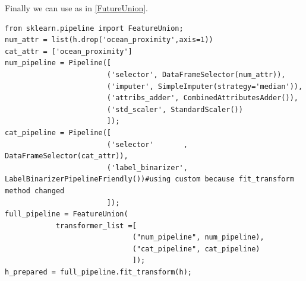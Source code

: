 Finally we can use  as in \autoref{FutureUnion}.
\begin{lstlisting}[caption=Usage of \ti{FutureUnion}, label=FutureUnion]
from sklearn.pipeline import FeatureUnion;
num_attr = list(h.drop('ocean_proximity',axis=1))
cat_attr = ['ocean_proximity']
num_pipeline = Pipeline([
                        ('selector', DataFrameSelector(num_attr)),
                        ('imputer', SimpleImputer(strategy='median')),
                        ('attribs_adder', CombinedAttributesAdder()),
                        ('std_scaler', StandardScaler())
                        ]);
cat_pipeline = Pipeline([
                        ('selector'       , DataFrameSelector(cat_attr)),
                        ('label_binarizer', LabelBinarizerPipelineFriendly())#using custom because fit_transform method changed
                        ]);
full_pipeline = FeatureUnion(
            transformer_list =[
                              ("num_pipeline", num_pipeline), 
                              ("cat_pipeline", cat_pipeline)
                              ]);
h_prepared = full_pipeline.fit_transform(h);
\end{lstlisting}
